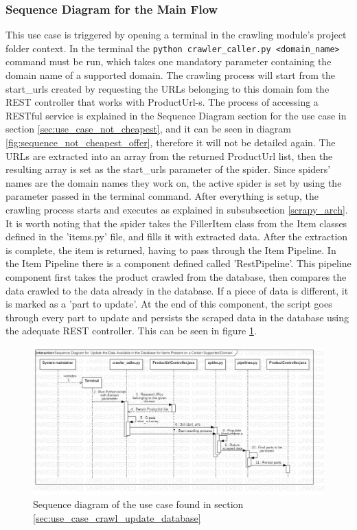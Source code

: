 \documentclass[12pt,a4paper,twoside]{report}
\begin{document}
\subsubsection{Sequence Diagram for the Main Flow}

This use case is triggered by opening a terminal in the crawling module's project folder context. In the terminal the \lstinline$python crawler_caller.py <domain_name>$ command must be run, which takes one mandatory parameter containing the domain name of a supported domain. The crawling process will start from the start\_urls created by requesting the URLs belonging to this domain fom the REST controller that works with ProductUrl-s. The process of accessing a RESTful service is explained in the Sequence Diagram section for the use case in section \ref{sec:use_case_not_cheapest}, and it can be seen in diagram \ref{fig:sequence_not_cheapest_offer}, therefore it will not be detailed again. The URLs are extracted into an array from the returned ProductUrl list, then the resulting array is set as the start\_urls parameter of the spider. Since spiders' names are the domain names they work on, the active spider is set by using the parameter passed in the terminal command. After everything is setup, the crawling process starts and executes as explained in subsubsection \ref{scrapy_arch}. It is worth noting that the spider takes the FillerItem class from the Item classes defined in the 'items.py' file, and fills it with extracted data. After the extraction is complete, the item is returned, having to pass through the Item Pipeline. In the Item Pipeline there is a component defined called 'RestPipeline'. This pipeline component first takes the product crawled from the database, then compares the data crawled to the data already in the database. If a piece of data is different, it is marked as a 'part to update'. At the end of this component, the script goes through every part to update and persists the scraped data in the database using the adequate REST controller. This can be seen in figure \ref{fig:sequence_crawl_update_database}.

\begin{figure}[ht]
  \centering
  \includegraphics[width=\linewidth]{img/sequence_crawl_update_database.png}
  \caption{Sequence diagram of the use case found in section \ref{sec:use_case_crawl_update_database}}
  \label{fig:sequence_crawl_update_database}
\end{figure}
\end{document}
